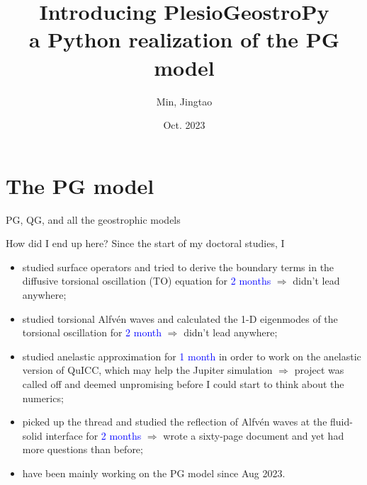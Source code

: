 \documentclass[11pt,aspectratio=169]{beamer}
\title{Introducing PlesioGeostroPy \\ {\normalsize a Python realization of the PG model}}
\date[Oct 2023]{Oct. 2023}
\author{Min, Jingtao}
\institute{EPM Group, Institut für Geophyik, ETH Zürich}
\begin{document}

\setlength{\titleboxwidth}{0.6\textwidth}			%
\titleframe




\section{The PG model}
\begin{frame}{PG, QG, and all the geostrophic models}
    
\end{frame}

\begin{frame}{How did I end up here?}
    Since the start of my doctoral studies, I
    \begin{itemize}
        \item studied surface operators and tried to derive the boundary terms in the diffusive torsional oscillation (TO) equation for \textcolor{blue}{2 months} $\Longrightarrow$ didn't lead anywhere;
        \item studied torsional Alfvén waves and calculated the 1-D eigenmodes of the torsional oscillation for \textcolor{blue}{2 month} $\Longrightarrow$ didn't lead anywhere;
        \item studied anelastic approximation for \textcolor{blue}{1 month} in order to work on the anelastic version of QuICC, which may help the Jupiter simulation $\Longrightarrow$ project was called off and deemed unpromising before I could start to think about the numerics;
        \item picked up the thread and studied the reflection of Alfvén waves at the fluid-solid interface for \textcolor{blue}{2 months} $\Longrightarrow$ wrote a sixty-page document and yet had more questions than before;
        \item have been mainly working on the PG model since Aug 2023.
    \end{itemize}
\end{frame}
\end{document}
